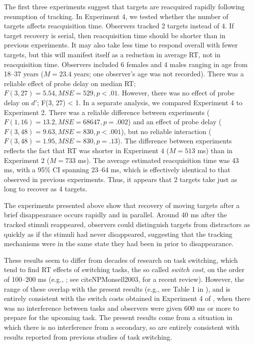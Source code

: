 \documentclass[jou,nobf]{apa}
\newcommand{\MSE}{\ensuremath{\mathit{MSE}}}
\begin{document}
The first three experiments suggest that targets are reacquired rapidly
following resumption of tracking.  In Experiment 4, we tested whether the
number of targets affects reacquisition time.  Observers tracked 2 targets
instead of 4.  If target recovery is serial, then reacquisition time should
be shorter than in previous experiments.  It may also take less time to
respond overall with fewer targets, but this will manifest itself as a
reduction in average RT, not in reacquisition time.  Observers included 6
females and 4 males ranging in age from 18--37 years ($M = 23.4$ years; one
observer's age was not recorded).  There was a reliable effect of probe
delay on median RT; $F(3, 27) = 5.54, \MSE = 529, p < .01$.  However, there
was no effect of probe delay on $d'$; F(3, 27) < 1.  In a separate
analysis, we compared Experiment 4 to Experiment 2.  There was a reliable
difference between experiments ($F(1, 16) = 13.2, \MSE = 68647, p = .002$)
and an effect of probe delay ($F(3, 48) = 9.63, \MSE = 830, p < .001$), but
no reliable interaction ($F(3, 48) = 1.95, \MSE = 830, p = .13$).  The
difference between experiments reflects the fact that RT was shorter in
Experiment 4 ($M = 513$ ms) than in Experiment 2 ($M = 733$ ms).  The
average estimated reacquisition time was 43 ms, with a 95\% CI spanning
23--64 ms, which is effectively identical to that observed in previous
experiments.  Thus, it appears that 2 targets take just as long to recover
as 4 targets.

The experiments presented above show that recovery of moving targets after
a brief disappearance occurs rapidly and in parallel.  Around 40 ms after
the tracked stimuli reappeared, observers could distinguish targets from
distractors as quickly as if the stimuli had never disappeared, suggesting
that the tracking mechanisms were in the same state they had been in prior
to disappearance.

These results seem to differ from decades of research on task switching,
which tend to find RT effects of switching tasks, the so called {\em switch
  cost}, on the order of 100--200 ms (e.g.,
; see
citeNP{Monsell2003}, for a recent review).  However, the range of these
overlap with the present results (e.g., see Table 1 in
), and is entirely consistent with the switch costs
obtained in Experiment 4 of , when there was no
interference between tasks and observers were given 600 ms or more to
prepare for the upcoming task.  The present results come from a situation
in which there is no interference from a secondary, so are entirely
consistent with results reported from previous studies of task switching.
\end{document}
